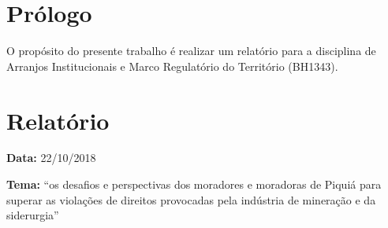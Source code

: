 \documentclass[
article,			%
11pt,				%
oneside,			%
a4paper,			%
english,			%
brazil,				%
sumario=tradicional
]{abntex2}
\begin{document}
	
	
	\frenchspacing 
	
	
	\maketitle
	
	
	\textual
	
	
	\section*{Prólogo}
	
	O propósito do presente trabalho é realizar um relatório para a disciplina de Arranjos Institucionais e Marco Regulatório do Território (BH1343).
	
	\section{Relatório}
	
	
	\noindent \textbf{Data:} 22/10/2018
	
	\noindent \textbf{Tema:} ``os desafios e perspectivas dos moradores e moradoras de Piquiá para superar as violações de direitos provocadas pela indústria de mineração e da siderurgia''
	
	\nocite{palestra2018}
	
\end{document}
